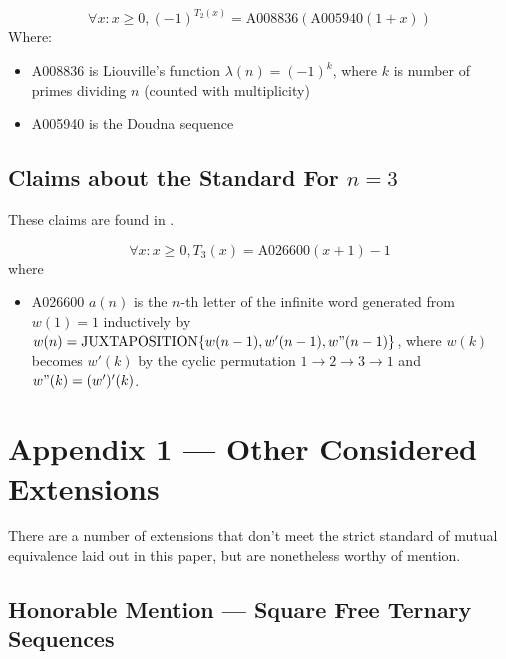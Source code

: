 \documentclass[conference]{IEEEtran}
\begin{document}
\begin{conjecture}
    \begin{equation}
        \forall x : x \ge 0, (-1)^{T_2(x)} = \text{A008836}(\text{A005940}(1+x))
    \end{equation}
    Where: \begin{itemize}
        \item A008836 \cite{OEIS-A008836} is Liouville's function $\lambda(n) = (-1)^k$, where $k$ is number of primes dividing $n$ (counted with multiplicity)
        \item A005940 \cite{OEIS-A005940} is the Doudna sequence
    \end{itemize}
\end{conjecture}

\subsection{Claims about the Standard \ETMS For $n=3$}

These claims are found in \cite{OEIS-TMS-3}.

\begin{conjecture}
    \begin{equation}
        \forall x : x \ge 0, T_3(x) = \text{A026600}(x+1) - 1
    \end{equation}
    where \begin{itemize}
        \item A026600 \cite{OEIS-A026600} $a(n)$ is the $n$-th letter of the infinite word generated from $w(1)=1$ inductively by $w(n)=\text{JUXTAPOSITION}\{w(n-1),w'(n-1),w"(n-1)\}$, where $w(k)$ becomes $w'(k)$ by the cyclic permutation $1\to2\to3\to1$ and $w"(k) = (w')'(k)$.
    \end{itemize}
\end{conjecture}

\section{Appendix 1 --- Other Considered Extensions}

There are a number of extensions that don't meet the strict standard of mutual equivalence laid out in this paper, but are nonetheless worthy of mention.

\subsection{Honorable Mention --- Square Free Ternary Sequences}
\end{document}
